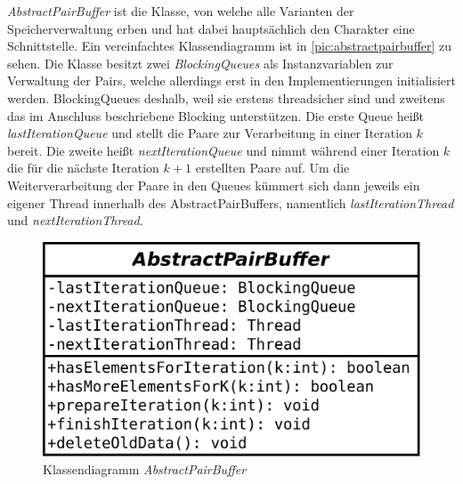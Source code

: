 \documentclass[12pt,a4paper]{article}
\begin{document}
\textit{AbstractPairBuffer} ist die Klasse, von welche alle Varianten der Speicherverwaltung erben und hat dabei hauptsächlich den Charakter eine Schnittstelle. Ein vereinfachtes Klassendiagramm ist in \autoref{pic:abstractpairbuffer} zu sehen. Die Klasse besitzt zwei \textit{BlockingQueues} als Instanzvariablen zur Verwaltung der Pairs, welche allerdings erst in den Implementierungen initialisiert werden.  BlockingQueues deshalb, weil sie erstens threadsicher sind und zweitens das im Anschluss beschriebene Blocking unterstützen. Die erste Queue heißt \textit{lastIterationQueue} und stellt die Paare zur Verarbeitung in einer Iteration $k$ bereit. Die zweite heißt \textit{nextIterationQueue} und nimmt während einer Iteration $k$ die für die nächste Iteration $k+1$ erstellten Paare auf. Um die Weiterverarbeitung der Paare in den Queues kümmert sich dann jeweils ein eigener Thread innerhalb des AbstractPairBuffers, namentlich \textit{lastIterationThread} und \textit{nextIterationThread}. 


\begin{figure}
\includegraphics[width=0.45\linewidth]{bilder/AbstractPairBuffer.png}
\caption{Klassendiagramm \textit{AbstractPairBuffer}}
\label{pic:abstractpairbuffer}
\end{figure}
\end{document}
